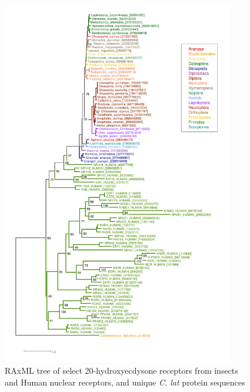 \begin{figure}[tbp]
  \includegraphics[width=4in]{./Chapter_Coelomomyces/img/20HE_NR_RAxMLTree.png}
  \caption[20HE and Nuclear Receptor RAxML tree]{RAxML tree of select 20-hydroxyecdysone receptors from insects and Human nuclear receptors, and unique \textit{C. lat} protein sequences}
  \label{fig:ChClat_20HE_NRtree}
\end{figure}

